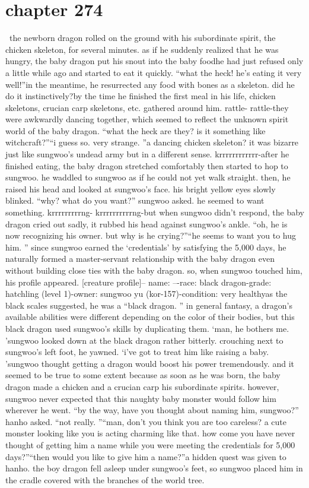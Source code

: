 \section{chapter 274}






 the newborn dragon rolled on the ground with his subordinate spirit, the chicken skeleton, for several minutes.
as if he suddenly realized that he was hungry, the baby dragon put his snout into the baby foodhe had just refused only a little while ago and started to eat it quickly.
“what the heck! he’s eating it very well!”in the meantime, he resurrected any food with bones as a skeleton.
 did he do it instinctively?by the time he finished the first meal in his life, chicken skeletons, crucian carp skeletons, etc.
 gathered around him.
rattle- rattle-they were awkwardly dancing together, which seemed to reflect the unknown spirit world of the baby dragon.
“what the heck are they? is it something like witchcraft?”“i guess so.
 very strange.
”a dancing chicken skeleton? it was bizarre just like sungwoo’s undead army but in a different sense.
krrrrrrrrrrrr-after he finished eating, the baby dragon stretched comfortably then started to hop to sungwoo.
he waddled to sungwoo as if he could not yet walk straight.
 then, he raised his head and looked at sungwoo’s face.
 his bright yellow eyes slowly blinked.
“why? what do you want?” sungwoo asked.
he seemed to want something.
krrrrrrrrrng- krrrrrrrrrrng-but when sungwoo didn’t respond, the baby dragon cried out sadly, it rubbed his head against sungwoo’s ankle.
“oh, he is now recognizing his owner.
 but why is he crying?”“he seems to want you to hug him.
”
since sungwoo earned the ‘credentials’ by satisfying the 5,000 days, he naturally formed a master-servant relationship with the baby dragon even without building close ties with the baby dragon.
so, when sungwoo touched him, his profile appeared.
[creature profile]– name: –-race: black dragon-grade: hatchling (level 1)-owner: sungwoo yu (kor-157)-condition: very healthyas the black scales suggested, he was a “black dragon.
” in general fantasy, a dragon’s available abilities were different depending on the color of their bodies, but this black dragon used sungwoo’s skills by duplicating them.
‘man, he bothers me.
’sungwoo looked down at the black dragon rather bitterly.
crouching next to sungwoo’s left foot, he yawned.
‘i’ve got to treat him like raising a baby.
’sungwoo thought getting a dragon would boost his power tremendously.
 and it seemed to be true to some extent because as soon as he was born, the baby dragon made a chicken and a crucian carp his subordinate spirits.
however, sungwoo never expected that this naughty baby monster would follow him wherever he went.
“by the way, have you thought about naming him, sungwoo?” hanho asked.
“not really.
”“man, don’t you think you are too careless? a cute monster looking like you is acting charming like that.
 how come you have never thought of getting him a name while you were meeting the credentials for 5,000 days?”“then would you like to give him a name?”a hidden quest was given to hanho.
the boy dragon fell asleep under sungwoo’s feet, so sungwoo placed him in the cradle covered with the branches of the world tree.

